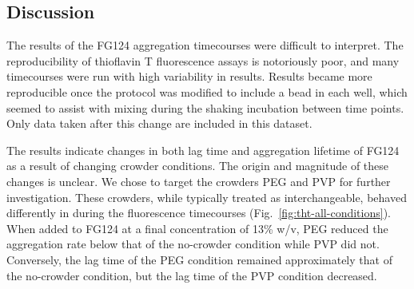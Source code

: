 


\subsection{Discussion}

The results of the FG124 aggregation timecourses were difficult to interpret.  The reproducibility of thioflavin T fluorescence assays is notoriously poor, and many timecourses were run with high variability in results.  Results became more reproducible once the protocol was modified to include a bead in each well, which seemed to assist with mixing during the shaking incubation between time points.  Only data taken after this change are included in this dataset.

The results indicate changes in both lag time and aggregation lifetime of FG124 as a result of changing crowder conditions.  The origin and magnitude of these changes is unclear.  We chose to target the crowders PEG and PVP for further investigation.  These crowders, while typically treated as interchangeable, behaved differently in during the fluorescence timecourses (Fig.~\ref{fig:tht-all-conditions}).  When added to FG124 at a final concentration of 13\% w/v, PEG reduced the aggregation rate below that of the no-crowder condition while PVP did not.  Conversely, the lag time of the PEG condition remained approximately that of the no-crowder condition, but the lag time of the PVP condition decreased.

